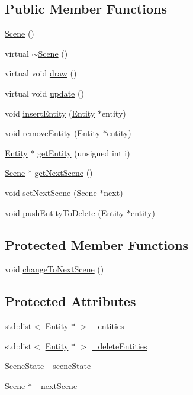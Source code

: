 \subsection*{Public Member Functions}
\begin{DoxyCompactItemize}
\item 
\hyperlink{class_scene_ad10176d75a9cc0da56626f682d083507}{Scene} ()
\item 
virtual \hyperlink{class_scene_a3b8cec2e32546713915f8c6303c951f1}{$\sim$Scene} ()
\item 
virtual void \hyperlink{class_scene_ac0e3d2c98ba6063a086467fb2c19142f}{draw} ()
\item 
virtual void \hyperlink{class_scene_aa24c7e636c10e4e42650c1374b90bb80}{update} ()
\item 
void \hyperlink{class_scene_ab07cbd5e581f410ea77f86591764435b}{insertEntity} (\hyperlink{class_entity}{Entity} $\ast$entity)
\item 
void \hyperlink{class_scene_a82c59d10dd6682fbb5d16e695b43cae4}{removeEntity} (\hyperlink{class_entity}{Entity} $\ast$entity)
\item 
\hyperlink{class_entity}{Entity} $\ast$ \hyperlink{class_scene_a5107f038eebdad8e7ab38ca2cd4371eb}{getEntity} (unsigned int i)
\item 
\hyperlink{class_scene}{Scene} $\ast$ \hyperlink{class_scene_a354843218b84e9cbe96172b0967ae4ae}{getNextScene} ()
\item 
void \hyperlink{class_scene_ac742b3975e402ae4172f47359f9370c9}{setNextScene} (\hyperlink{class_scene}{Scene} $\ast$next)
\item 
void \hyperlink{class_scene_aa215f0a9dae942612c175b686669498b}{pushEntityToDelete} (\hyperlink{class_entity}{Entity} $\ast$entity)
\end{DoxyCompactItemize}
\subsection*{Protected Member Functions}
\begin{DoxyCompactItemize}
\item 
void \hyperlink{class_scene_ab94fd30420e8336c6dde7b91de209031}{changeToNextScene} ()
\end{DoxyCompactItemize}
\subsection*{Protected Attributes}
\begin{DoxyCompactItemize}
\item 
std::list$<$ \hyperlink{class_entity}{Entity} $\ast$ $>$ \hyperlink{class_scene_a0819f6cd7c31259233dc36be35288118}{\_\-entities}
\item 
std::list$<$ \hyperlink{class_entity}{Entity} $\ast$ $>$ \hyperlink{class_scene_a886d916ab7695db8a4103b8a5fc2e098}{\_\-deleteEntities}
\item 
\hyperlink{class_scene_a390db78d3a8e0fa83e861074e8690e87}{SceneState} \hyperlink{class_scene_a2e429bb792232007aa02c7dd544cfc90}{\_\-sceneState}
\item 
\hyperlink{class_scene}{Scene} $\ast$ \hyperlink{class_scene_a93ba696da115a11e84d696be7f35c3d6}{\_\-nextScene}
\end{DoxyCompactItemize}


